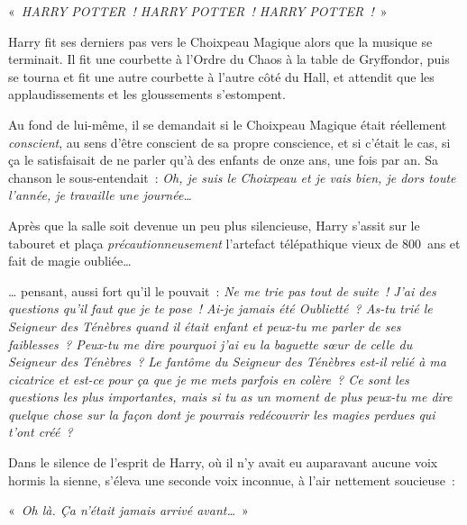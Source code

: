 «~\emph{HARRY POTTER~! HARRY POTTER~! HARRY POTTER~!}~»

Harry fit ses derniers pas vers le Choixpeau Magique alors que la musique se terminait. Il fit une courbette à l'Ordre du Chaos à la table de Gryffondor, puis se tourna et fit une autre courbette à l'autre côté du Hall, et attendit que les applaudissements et les gloussements s'estompent.

Au fond de lui-même, il se demandait si le Choixpeau Magique était réellement \emph{conscient}, au sens d'être conscient de sa propre conscience, et si c'était le cas, si ça le satisfaisait de ne parler qu'à des enfants de onze ans, une fois par an. Sa chanson le sous-entendait~: \emph{Oh, je suis le Choixpeau et je vais bien, je dors toute l'année, je travaille une journée…}

Après que la salle soit devenue un peu plus silencieuse, Harry s'assit sur le tabouret et plaça \emph{précautionneusement} l'artefact télépathique vieux de 800~ans et fait de magie oubliée…

… pensant, aussi fort qu'il le pouvait~: \emph{Ne me trie pas tout de suite~! J'ai des questions qu'il faut que je te pose~! Ai-je jamais été Oublietté~? As-tu trié le Seigneur des Ténèbres quand il était enfant et peux-tu me parler de ses faiblesses~? Peux-tu me dire pourquoi j'ai eu la baguette sœur de celle du Seigneur des Ténèbres~? Le fantôme du Seigneur des Ténèbres est-il relié à ma cicatrice et est-ce pour ça que je me mets parfois en colère~? Ce sont les questions les plus importantes, mais si tu as un moment de plus peux-tu me dire quelque chose sur la façon dont je pourrais redécouvrir les magies perdues qui t'ont créé~?}

Dans le silence de l'esprit de Harry, où il n'y avait eu auparavant aucune voix hormis la sienne, s'éleva une seconde voix inconnue, à l'air nettement soucieuse~:

«~\emph{Oh là. Ça n'était jamais arrivé avant…}~»

